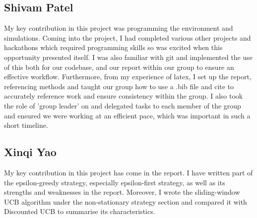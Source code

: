 \subsection{Shivam Patel}\label{subsec:shivam-patel}
My key contribution in this project was programming the environment and simulations.
Coming into the project, I had completed various other projects and hackathons which required programming skills so was excited when this opportunity presented itself.
I was also familiar with git and implemented the use of this both for our codebase, and our report within our group to ensure an effective workflow.
Furthermore, from my experience of latex, I set up the report, referencing methods and taught our group how to use a .bib file and cite to accurately reference work and ensure consistency within the group.
I also took the role of 'group leader' on and delegated tasks to each member of the group and ensured we were working at an efficient pace, which was important in such a short timeline.

\subsection{Xinqi Yao}\label{subsec:xinqi-yao}
My key contribution in this project has come in the report. 
I have written part of the epsilon-greedy strategy, especially epsilon-first strategy, as well as its strengths and weaknesses in the report.
Moreover, I wrote the sliding-window UCB algorithm under the non-stationary strategy section and compared it with Discounted UCB to summarise its characteristics.
